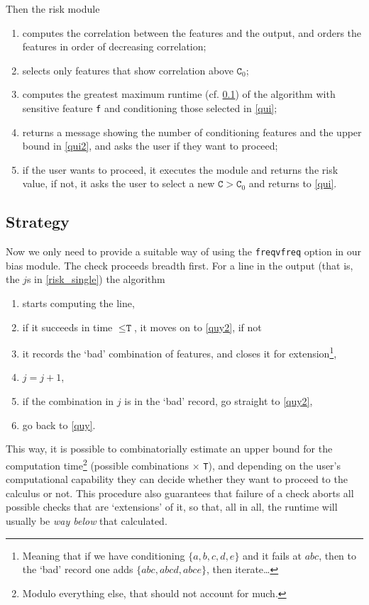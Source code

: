 \documentclass{article}
\begin{document}
Then the risk module

\begin{enumerate}
\item computes the correlation between the features and the output, and orders the features in order of decreasing correlation;
\item selects only features that show correlation above $\texttt{C}_0$;\label{qui}
\item computes the greatest maximum runtime (cf. \ref{strategy}) of the algorithm with sensitive feature \texttt{f} and conditioning those selected in \ref{qui};\label{qui2}
\item returns a message showing the number of conditioning features and the upper bound in \ref{qui2}, and asks the user if they want to proceed;
\item if the user wants to proceed, it executes the module and returns the risk value, if not, it asks the user to select a new $\texttt{C}>\texttt{C}_0$ and returns to \ref{qui}.
\end{enumerate}

\subsection{Strategy}\label{strategy}
Now we only need to provide a suitable way of using the \texttt{freqvfreq} option in our bias module. The check proceeds breadth first. For a line in the output (that is, the $j$s in \ref{risk_single}) the algorithm
\begin{enumerate}
\item starts computing the line,\label{quy}
\item if it succeeds in time $\leq\texttt{T}$, it moves on to \ref{quy2}, if not
\item it records the `bad' combination of features, and closes it for extension\footnote{Meaning that if we have conditioning $\{a,b,c,d,e\}$ and it fails at $abc$, then to the `bad' record one adds $\{abc, abcd, abce\}$, then iterate\dots},\label{bad_record}
\item $j=j+1$,\label{quy2}
\item if the combination in $j$ is in the `bad' record, go straight to \ref{quy2},
\item go back to \ref{quy}.
\end{enumerate}
This way, it is possible to combinatorially estimate an upper bound for the computation time\footnote{Modulo everything else, that should not account for much.} (possible combinations $\times$ \texttt{T}), and depending on the user's computational capability they can decide whether they want to proceed to the calculus or not. This procedure also guarantees that failure of a check aborts all possible checks that are `extensions' of it, so that, all in all, the runtime will usually be \emph{way below} that calculated. 



\end{document}

